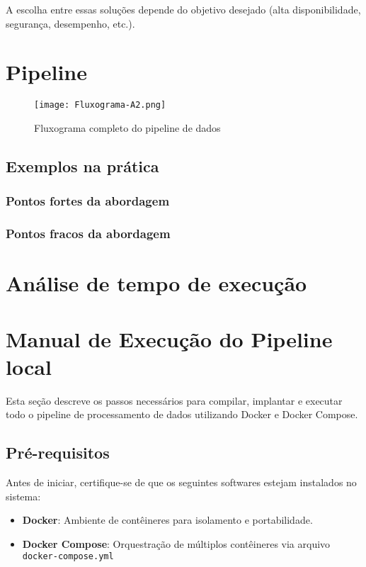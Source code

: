 \documentclass[a4paper,12pt]{article}
\begin{document}
A escolha entre essas soluções depende do objetivo desejado (alta disponibilidade, segurança, desempenho, etc.).


\section{Pipeline}

\begin{figure}[H]
    \centering
    \texttt{[image: Fluxograma-A2.png]}
    \caption{Fluxograma completo do pipeline de dados}
    \label{fig:pipeline}
\end{figure}

\subsection*{Exemplos na prática}

\subsubsection*{Pontos fortes da abordagem}

\subsubsection*{Pontos fracos da abordagem}




\section{Análise de tempo de execução}



\section{Manual de Execução do Pipeline local}

Esta seção descreve os passos necessários para compilar, implantar e executar todo o pipeline de processamento de dados utilizando Docker e Docker Compose.

\subsection*{Pré-requisitos}

Antes de iniciar, certifique-se de que os seguintes softwares estejam instalados no sistema:

\begin{itemize}
    \item \textbf{Docker}: Ambiente de contêineres para isolamento e portabilidade.
    \item \textbf{Docker Compose}: Orquestração de múltiplos contêineres via arquivo \texttt{docker-compose.yml}
\end{itemize}
\end{document}
